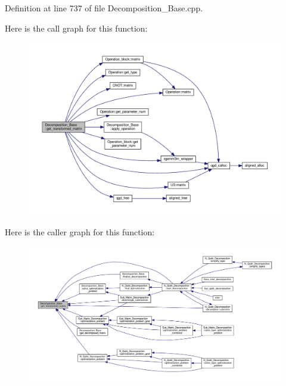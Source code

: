 Definition at line 737 of file Decomposition\+\_\+\+Base.\+cpp.



Here is the call graph for this function\+:
\nopagebreak
\begin{figure}[H]
\begin{center}
\leavevmode
\includegraphics[width=350pt]{class_decomposition___base_a8e26f5a31475e4d5a2e9c785a2a57dd9_cgraph}
\end{center}
\end{figure}




Here is the caller graph for this function\+:
\nopagebreak
\begin{figure}[H]
\begin{center}
\leavevmode
\includegraphics[width=350pt]{class_decomposition___base_a8e26f5a31475e4d5a2e9c785a2a57dd9_icgraph}
\end{center}
\end{figure}


